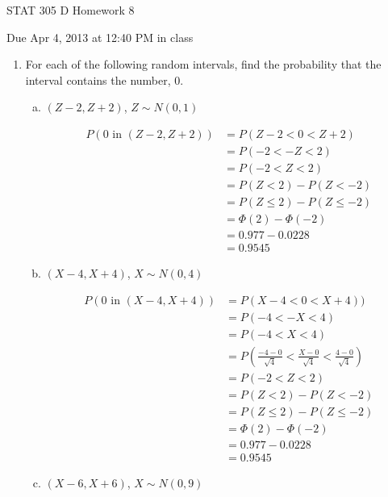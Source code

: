 \documentclass{article}\usepackage{graphicx, color}
\numberwithin{equation}{section}
\begin{document}
\begin{flushleft}
\begin{center} \LARGE
STAT 305 D Homework 8
\end{center}
\begin{center} \Large
Due Apr 4, 2013 at 12:40 PM in class
\end{center}
\normalsize


\begin{enumerate}[1. ]

\item For each of the following random intervals, find the probability that the interval contains the number, 0.

\begin{enumerate}[a. ]
\item $(Z-2, Z+2)$, $Z \sim N(0,1)$

\color{red}
\begin{align*}
P(0 \text{ in } (Z-2, Z+2)) & = P( Z-2 < 0 < Z+2) \\
& = P(-2 < -Z < 2) \\
& = P(-2 < Z < 2) \\
& = P(Z < 2) - P(Z < -2) \\
& = P(Z \le 2) - P(Z \le -2) \\
& = \Phi(2) - \Phi(-2) \\
& = 0.977 - 0.0228 \\
& = 0.9545
\end{align*}
\color{black}

\item $(X-4,X+4)$, $X \sim N(0, 4)$

\color{red}
\begin{align*}
P(0 \text{ in } (X-4, X+4) ) & = P(X - 4 < 0 < X + 4)) \\
& = P(-4 < -X < 4) \\
& = P(-4 < X < 4) \\
& = P\left(\frac{-4-0}{\sqrt{4}} < \frac{X-0}{\sqrt{4}} < \frac{4 - 0}{\sqrt{4}} \right) \\
& = P(-2 < Z < 2) \\
& = P(Z < 2) - P(Z < -2) \\
& = P(Z \le 2) - P(Z \le -2) \\
& = \Phi(2) - \Phi(-2) \\
& = 0.977 - 0.0228 \\
& = 0.9545
\end{align*}
\color{black}


\item $(X-6, X+6)$, $X \sim N(0,9)$



\end{enumerate}
\end{enumerate}
\end{flushleft}
\end{document}
